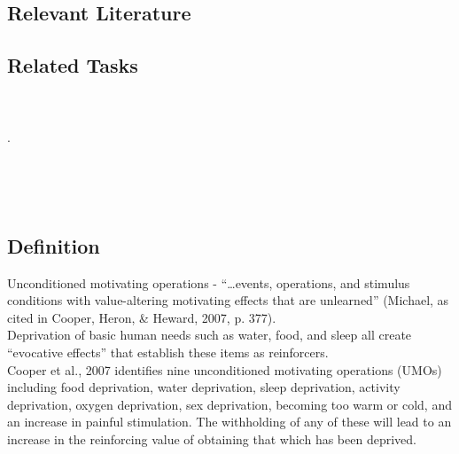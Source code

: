 \subsection{Relevant Literature}
\begin{refsection}
\nocite{test,alang2017police,clayton2018black}
\printbibliography[heading=none]
\end{refsection}
%
\subsection{Related Tasks}
\foureOne{}\\
\fourdOne{}\\.
\fourdSixteen{}\\
\fourFKFourteen{}\\
\fourFKFifteen{}\\
\fourFKSixteen{}\\
%
%
%
%
%
\section{\fourFKTwentySix{}}
\subsection{Definition}
Unconditioned motivating operations - ``…events, operations, and stimulus conditions with value-altering motivating effects that are unlearned'' (Michael, as cited in Cooper, Heron, \& Heward, 2007, p. 377).\\
Deprivation of basic human needs such as water, food, and sleep all create ``evocative effects'' that establish these items as reinforcers.\\

Cooper et al., 2007 identifies nine unconditioned motivating operations (UMOs) including food deprivation, water deprivation, sleep deprivation, activity deprivation, oxygen deprivation, sex deprivation, becoming too warm or cold, and an increase in painful stimulation. The withholding of any of these will lead to an increase in the reinforcing value of obtaining that which has been deprived.\\

